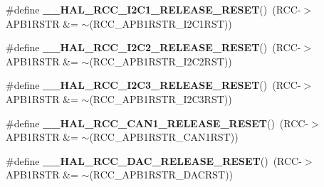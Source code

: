 \begin{DoxyCompactItemize}
\item 
\mbox{\label{group___r_c_c_ex___force___release___peripheral___reset_ga87cc8c2107c1d0820cc1f7e2aeb1aeb9}} 
\#define {\bfseries \+\_\+\+\_\+\+H\+A\+L\+\_\+\+R\+C\+C\+\_\+\+I2\+C1\+\_\+\+R\+E\+L\+E\+A\+S\+E\+\_\+\+R\+E\+S\+ET}()~(R\+CC-\/$>$A\+P\+B1\+R\+S\+TR \&= $\sim$(R\+C\+C\+\_\+\+A\+P\+B1\+R\+S\+T\+R\+\_\+\+I2\+C1\+R\+ST))
\item 
\mbox{\label{group___r_c_c_ex___force___release___peripheral___reset_ga2fa8cc909b285813af86c253ec110356}} 
\#define {\bfseries \+\_\+\+\_\+\+H\+A\+L\+\_\+\+R\+C\+C\+\_\+\+I2\+C2\+\_\+\+R\+E\+L\+E\+A\+S\+E\+\_\+\+R\+E\+S\+ET}()~(R\+CC-\/$>$A\+P\+B1\+R\+S\+TR \&= $\sim$(R\+C\+C\+\_\+\+A\+P\+B1\+R\+S\+T\+R\+\_\+\+I2\+C2\+R\+ST))
\item 
\mbox{\label{group___r_c_c_ex___force___release___peripheral___reset_ga383f01978613c3b08659efab5153b4b9}} 
\#define {\bfseries \+\_\+\+\_\+\+H\+A\+L\+\_\+\+R\+C\+C\+\_\+\+I2\+C3\+\_\+\+R\+E\+L\+E\+A\+S\+E\+\_\+\+R\+E\+S\+ET}()~(R\+CC-\/$>$A\+P\+B1\+R\+S\+TR \&= $\sim$(R\+C\+C\+\_\+\+A\+P\+B1\+R\+S\+T\+R\+\_\+\+I2\+C3\+R\+ST))
\item 
\mbox{\label{group___r_c_c_ex___force___release___peripheral___reset_ga4b2e677ba2e3a39f1c8f0c074ce50664}} 
\#define {\bfseries \+\_\+\+\_\+\+H\+A\+L\+\_\+\+R\+C\+C\+\_\+\+C\+A\+N1\+\_\+\+R\+E\+L\+E\+A\+S\+E\+\_\+\+R\+E\+S\+ET}()~(R\+CC-\/$>$A\+P\+B1\+R\+S\+TR \&= $\sim$(R\+C\+C\+\_\+\+A\+P\+B1\+R\+S\+T\+R\+\_\+\+C\+A\+N1\+R\+ST))
\item 
\mbox{\label{group___r_c_c_ex___force___release___peripheral___reset_ga1ac476b29c9395378bc16a7c4df08c7c}} 
\#define {\bfseries \+\_\+\+\_\+\+H\+A\+L\+\_\+\+R\+C\+C\+\_\+\+D\+A\+C\+\_\+\+R\+E\+L\+E\+A\+S\+E\+\_\+\+R\+E\+S\+ET}()~(R\+CC-\/$>$A\+P\+B1\+R\+S\+TR \&= $\sim$(R\+C\+C\+\_\+\+A\+P\+B1\+R\+S\+T\+R\+\_\+\+D\+A\+C\+R\+ST))
\item 
\mbox{\label{group___r_c_c_ex___force___release___peripheral___reset_gaeee4f925c087fe23254850891330c5b5}} 

\end{DoxyCompactItemize}
